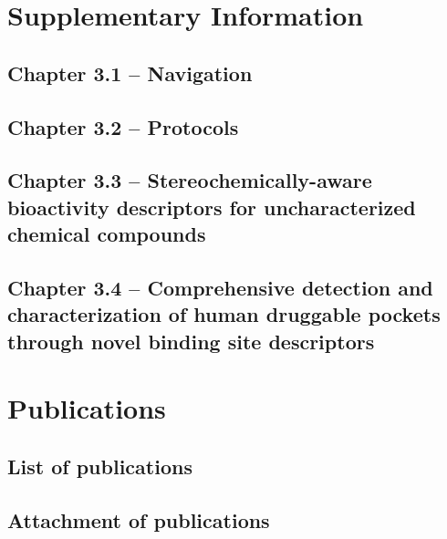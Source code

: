 \titleformat{\section}[block]
  {\normalfont\LARGE\bfseries}{\thesection}{1em}{}


\chapter{Supplementary Information}
\newpage

\section{Chapter 3.1 -- Navigation}
\section{Chapter 3.2 -- Protocols}


\section{Chapter 3.3 -- Stereochemically-aware bioactivity descriptors for uncharacterized chemical compounds}



\section{Chapter 3.4 -- Comprehensive detection and characterization of human druggable pockets through novel binding site descriptors}




\chapter{Publications}
\newpage
\section{List of publications}
\section{Attachment of publications}

